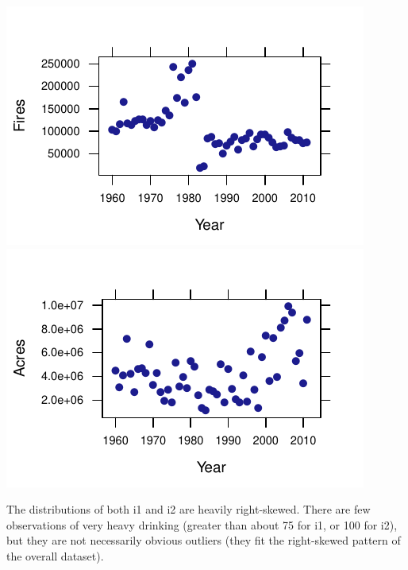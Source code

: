 \documentclass[twoside]{book}\usepackage[]{graphicx}\usepackage[]{xcolor}
\makeatletter
\def\maxwidth{ %
  \ifdim\Gin@nat@width>\linewidth
    \linewidth
  \else
    \Gin@nat@width
  \fi
}
\newenvironment{knitrout}{}{} %
\makeatother
\begin{document}
\begin{solution}
\begin{knitrout}
{\centering \includegraphics[width=\maxwidth]{figures/fig-unnamed-chunk-31-1} 
\includegraphics[width=\maxwidth]{figures/fig-unnamed-chunk-31-2} 

}



\end{knitrout}
The distributions of both i1 and i2 are heavily right-skewed. There are few observations of very heavy drinking (greater than about 75 for i1, or 100 for i2), but they are not necessarily obvious outliers (they fit the right-skewed pattern of the overall dataset).
\end{solution}
\end{document}
